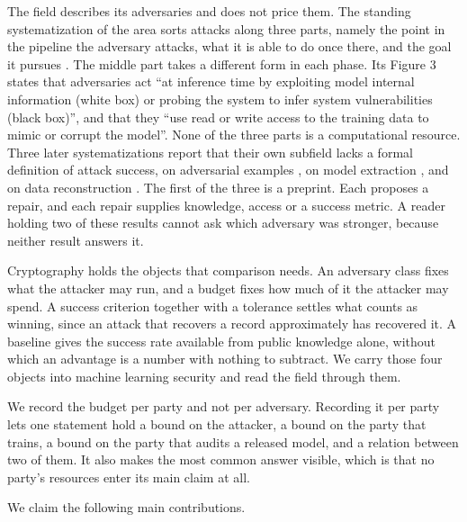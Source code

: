 The field describes its adversaries and does not price them. The standing
systematization of the area sorts attacks along three parts, namely the point
in the pipeline the adversary attacks, what it is able to do once there, and
the goal it pursues \cite{PMSW18}. The middle part takes a different form in
each phase. Its Figure 3 states that adversaries act ``at inference time by
exploiting model internal information (white box) or probing the system to
infer system vulnerabilities (black box)'', and that they ``use read or write
access to the training data to mimic or corrupt the model''. None of the three
parts is a computational resource. Three later systematizations report that
their own subfield lacks a formal definition of attack success, on adversarial
examples
\cite{FK24}, on model extraction \cite{SSEP24}, and on data reconstruction
\cite{WLBZ25}. The first of the three is a preprint. Each proposes a repair, and
each repair supplies knowledge, access or a success metric. A reader holding
two of these results cannot ask which adversary was stronger, because neither
result answers it.

Cryptography holds the objects that comparison needs. An adversary class fixes
what the attacker may run, and a budget fixes how much of it the attacker may
spend. A success criterion together with a tolerance settles what counts as
winning, since an attack that recovers a record approximately has recovered
it. A baseline gives the success rate available from public knowledge alone,
without which an advantage is a number with nothing to subtract. We carry
those four objects into machine learning security and read the field through
them.

We record the budget per party and not per adversary. Recording it per party
lets one statement hold a bound on the attacker, a bound on the party that
trains, a bound on the party that audits a released model, and a relation
between two of them. It also makes the most common answer visible, which is
that no party's resources enter its main claim at all.

We claim the following main contributions.

